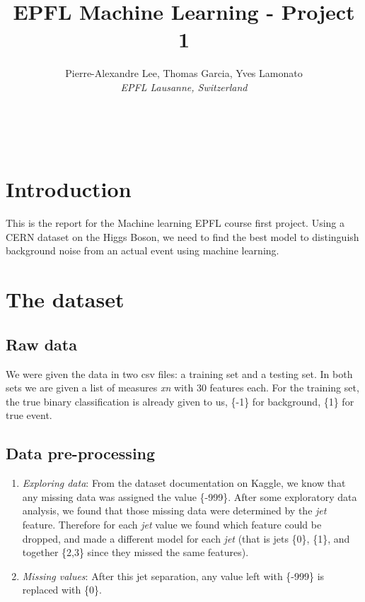 \documentclass[a4paper]{article}
\begin{document}
\title{EPFL Machine Learning - Project 1}
\author{
  Pierre-Alexandre Lee, Thomas Garcia, Yves Lamonato\\
  \textit{EPFL Lausanne, Switzerland}
}
\date{\vspace{-5ex}}

\maketitle
\mbox{}\\

\begin{multicols*}{2}

\section{Introduction}
This is the report for the Machine learning EPFL course first project. Using a CERN dataset on the Higgs Boson, we need to find the best model to distinguish background noise from an actual event using machine learning. 

\section{The dataset}
\subsection{Raw data}
We were given the data in two csv files: a training set and a testing set. In both sets we are given a list of measures \textit{xn} with 30 features each. For the training set, the true binary classification is already given to us, \{-1\} for background, \{1\} for true event.
\subsection{Data pre-processing}
\begin{enumerate}
\item \textit{Exploring data}: From the dataset documentation on Kaggle, we know that any missing data was assigned the value \{-999\}. After some exploratory data analysis, we found that those missing data were determined by the \textit{jet} feature. Therefore for each \textit{jet} value we found which feature could be dropped, and made a different model for each \textit{jet} (that is jets \{0\}, \{1\}, and together \{2,3\} since they missed the same features).

\item \textit{Missing values}: After this jet separation, any value left with \{-999\} is replaced with \{0\}.


\end{enumerate}
\end{multicols*}
\end{document}
